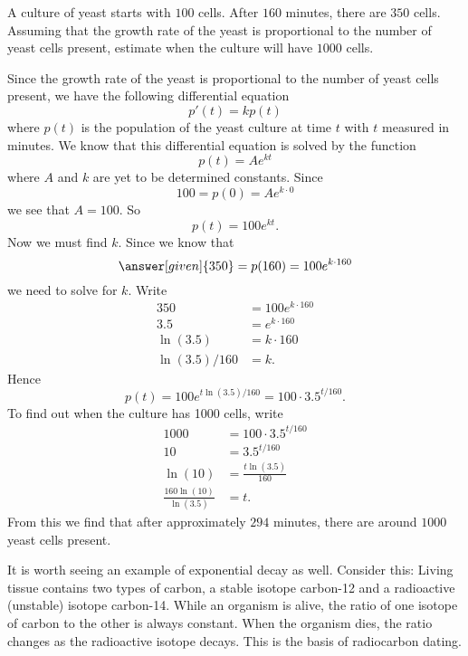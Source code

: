 \documentclass{ximera}
\begin{document}
\begin{example}
A culture of yeast starts with $100$ cells. After $160$ minutes, there
are $350$ cells. Assuming that the growth rate of the yeast is
proportional to the number of yeast cells present, estimate when the
culture will have $1000$ cells.

\begin{explanation}
Since the growth rate of the yeast is proportional to the number of
yeast cells present, we have the following differential equation
\[
p'(t) = k p(t)
\]
where $p(t)$ is the population of the yeast culture at time $t$ with
$t$ measured in minutes. We know that this differential equation is
solved by the function
\[
p(t) = A e^{kt}
\]
where $A$ and $k$ are yet to be determined constants. Since
\[
100 = p(0) = Ae^{k\cdot 0}
\]
we see that $A = 100$. So 
\[
p(t) = 100 e^{kt}.
\]
Now we must find $k$. Since we know that 
\[
\answer[given]{350} = p(160) = 100e^{k\cdot 160}
\]
we need to solve for $k$. Write
\begin{align*}
350 &= 100 e^{k\cdot 160}\\
3.5 &= e^{k\cdot 160}\\
\ln(3.5) &= k\cdot 160\\
\ln(3.5)/160 &= k. 
\end{align*}
Hence
\[
p(t) = 100 e^{t\ln(3.5)/160} = 100 \cdot 3.5^{t/160}.
\]
To find out when the culture has 1000 cells, write
\begin{align*}
1000 &= 100 \cdot 3.5^{t/160}\\
10 &= 3.5^{t/160}\\
\ln(10) &= \frac{t\ln(3.5)}{160}\\
\frac{160\ln(10)}{\ln(3.5)} &= t.
\end{align*}
From this we find that after approximately $294$ minutes, there are
around $1000$ yeast cells present.
\end{explanation}
\end{example}

It is worth seeing an example of exponential decay as well. Consider
this: Living tissue contains two types of carbon, a stable isotope
carbon-12 and a radioactive (unstable) isotope carbon-14. While an
organism is alive, the ratio of one isotope of carbon to the other is
always constant. When the organism dies, the ratio changes as the
radioactive isotope decays.  This is the basis of radiocarbon dating.
\end{document}
